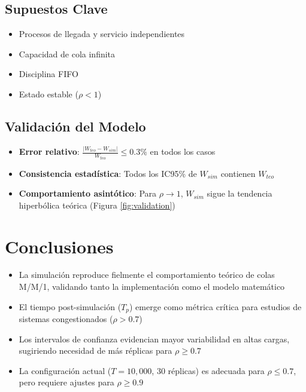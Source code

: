 \documentclass{article}
\begin{document}
	\subsection{Supuestos Clave}
	\begin{itemize}
		\item Procesos de llegada y servicio independientes
		\item Capacidad de cola infinita
		\item Disciplina FIFO
		\item Estado estable ($\rho < 1$)
	\end{itemize}
	
	\subsection{Validación del Modelo}
	\begin{itemize}
		\item \textbf{Error relativo}: $\frac{|W_{teo} - W_{sim}|}{W_{teo}} \leq 0.3\%$ en todos los casos
		\item \textbf{Consistencia estadística}: Todos los IC95\% de $W_{sim}$ contienen $W_{teo}$
		\item \textbf{Comportamiento asintótico}: Para $\rho \to 1$, $W_{sim}$ sigue la tendencia hiperbólica teórica (Figura \ref{fig:validation})
	\end{itemize}
	
	\section{Conclusiones} \label{S5}
	\begin{itemize}
		\item La simulación reproduce fielmente el comportamiento teórico de colas M/M/1, validando tanto la implementación como el modelo matemático
		\item El tiempo post-simulación ($T_p$) emerge como métrica crítica para estudios de sistemas congestionados ($\rho > 0.7$)
		\item Los intervalos de confianza evidencian mayor variabilidad en altas cargas, sugiriendo necesidad de más réplicas para $\rho \geq 0.7$
		\item La configuración actual ($T=10,000$, 30 réplicas) es adecuada para $\rho \leq 0.7$, pero requiere ajustes para $\rho \geq 0.9$
	\end{itemize}
	
\end{document}
